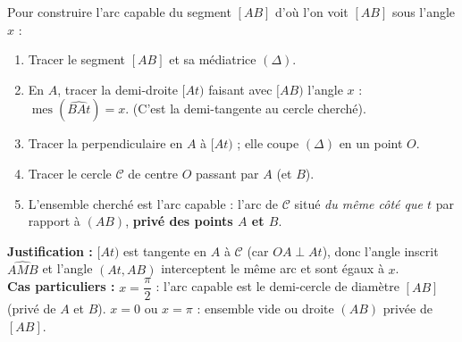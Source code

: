\documentclass[11pt]{article}
\newcommand{\cle}[1]{{\popxbold\color{popdark}#1}}
\begin{document}
\begin{methode}[{Construire l'ensemble des points $M$ tels que $\operatorname{mes}(\widehat{AMB})=x$, $x\in[0\,;\pi]$}]
Pour construire l'arc capable du segment $[AB]$ d'où l'on voit $[AB]$ sous l'angle $x$ :
\begin{enumerate}
\item Tracer le segment $[AB]$ et sa médiatrice $(\Delta)$.
\item En $A$, tracer la demi-droite $[At)$ faisant avec $[AB)$ l'angle $x$ : $\operatorname{mes}(\widehat{BAt})=x$. (C'est la \cle{demi-tangente} au cercle cherché).
\item Tracer la perpendiculaire en $A$ à $[At)$ ; elle coupe $(\Delta)$ en un point $O$.
\item Tracer le cercle $\mathcal{C}$ de centre $O$ passant par $A$ (et $B$).
\item L'ensemble cherché est l'\cle{arc capable} : l'arc de $\mathcal{C}$ situé \emph{du même côté que $t$} par rapport à $(AB)$, \textbf{privé des points $A$ et $B$}.
\end{enumerate}
\textbf{Justification :} $[At)$ est tangente en $A$ à $\mathcal{C}$ (car $OA\perp At$), donc l'angle inscrit $\widehat{AMB}$ et l'angle $(At,AB)$ interceptent le même arc et sont égaux à $x$.\\
\textbf{Cas particuliers :} $x=\dfrac{\pi}{2}$ : l'arc capable est le demi-cercle de diamètre $[AB]$ (privé de $A$ et $B$). $x=0$ ou $x=\pi$ : ensemble vide ou droite $(AB)$ privée de $[AB]$.
\end{methode}
\end{document}

